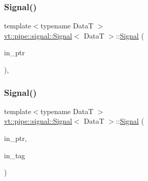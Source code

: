 \mbox{\label{structvt_1_1pipe_1_1signal_1_1_signal_ac0daf7c39233e5fe853ff3a4ec8f1d57}} 
\subsubsection{\texorpdfstring{Signal()}{Signal()}\hspace{0.1cm}{\footnotesize\ttfamily [4/5]}}
{\footnotesize\ttfamily template$<$typename DataT $>$ \\
\hyperlink{structvt_1_1pipe_1_1signal_1_1_signal}{vt\+::pipe\+::signal\+::\+Signal}$<$ DataT $>$\+::\hyperlink{structvt_1_1pipe_1_1signal_1_1_signal}{Signal} (\begin{DoxyParamCaption}\item[{\hyperlink{structvt_1_1pipe_1_1signal_1_1_signal_a9c8166338314e5d595575c21eaa42859}{Data\+Ptr\+Type}}]{in\+\_\+ptr }\end{DoxyParamCaption})\hspace{0.3cm}{\ttfamily [inline]}, {\ttfamily [explicit]}}

\mbox{\label{structvt_1_1pipe_1_1signal_1_1_signal_a6fd49ac7971cb93dd3caf0d079c30fed}} 
\subsubsection{\texorpdfstring{Signal()}{Signal()}\hspace{0.1cm}{\footnotesize\ttfamily [5/5]}}
{\footnotesize\ttfamily template$<$typename DataT $>$ \\
\hyperlink{structvt_1_1pipe_1_1signal_1_1_signal}{vt\+::pipe\+::signal\+::\+Signal}$<$ DataT $>$\+::\hyperlink{structvt_1_1pipe_1_1signal_1_1_signal}{Signal} (\begin{DoxyParamCaption}\item[{\hyperlink{structvt_1_1pipe_1_1signal_1_1_signal_a9c8166338314e5d595575c21eaa42859}{Data\+Ptr\+Type}}]{in\+\_\+ptr,  }\item[{\hyperlink{namespacevt_a84ab281dae04a52a4b243d6bf62d0e52}{Tag\+Type}}]{in\+\_\+tag }\end{DoxyParamCaption})\hspace{0.3cm}{\ttfamily [inline]}}



